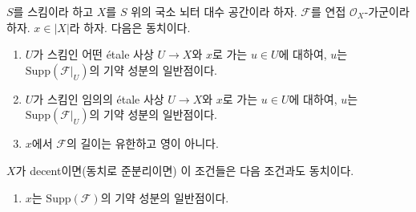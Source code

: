 \begin{lemma}
\label{lemma-length-finite}
$S$를 스킴이라 하고 $X$를 $S$ 위의 국소 뇌터 대수 공간이라 하자.
$\mathcal{F}$를 연접 $\mathcal{O}_X$-가군이라 하자.
$x \in |X|$라 하자. 다음은 동치이다.
\begin{enumerate}
\item $U$가 스킴인 어떤 \'etale 사상 $U \to X$와 $x$로 가는
$u \in U$에 대하여, $u$는 $\text{Supp}(\mathcal{F}|_U)$의 기약 성분의
일반점이다.
\item $U$가 스킴인 임의의 \'etale 사상 $U \to X$와 $x$로 가는
$u \in U$에 대하여, $u$는 $\text{Supp}(\mathcal{F}|_U)$의 기약 성분의
일반점이다.
\item $x$에서 $\mathcal{F}$의 길이는 유한하고 영이 아니다.
\end{enumerate}
$X$가 decent이면(동치로 준분리이면) 이 조건들은 다음 조건과도 동치이다.
\begin{enumerate}
\item[(4)] $x$는 $\text{Supp}(\mathcal{F})$의 기약 성분의 일반점이다.
\end{enumerate}
\end{lemma}

